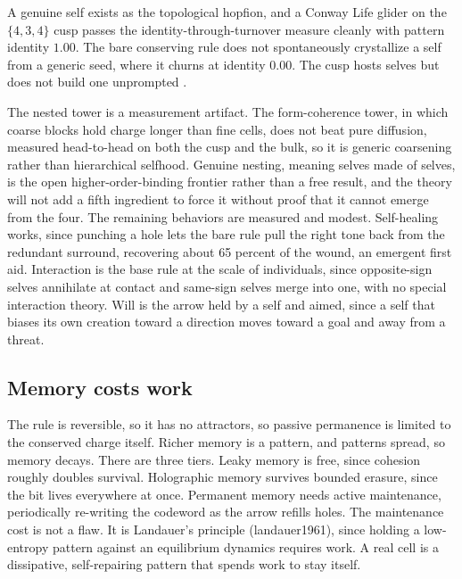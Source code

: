 \begin{result}
A genuine self exists as the topological hopfion, and a Conway Life glider on the $\{4,3,4\}$ cusp passes the identity-through-turnover measure cleanly with pattern identity $1.00$. The bare conserving rule does not spontaneously crystallize a self from a generic seed, where it churns at identity $0.00$. The cusp hosts selves but does not build one unprompted \cite{pollard2026vibetest}.
\end{result}

The nested tower is a measurement artifact. The form-coherence tower, in which coarse blocks hold charge longer than fine cells, does not beat pure diffusion, measured head-to-head on both the cusp and the bulk, so it is generic coarsening rather than hierarchical selfhood. Genuine nesting, meaning selves made of selves, is the open higher-order-binding frontier rather than a free result, and the theory will not add a fifth ingredient to force it without proof that it cannot emerge from the four. The remaining behaviors are measured and modest. Self-healing works, since punching a hole lets the bare rule pull the right tone back from the redundant surround, recovering about 65 percent of the wound, an emergent first aid. Interaction is the base rule at the scale of individuals, since opposite-sign selves annihilate at contact and same-sign selves merge into one, with no special interaction theory. Will is the arrow held by a self and aimed, since a self that biases its own creation toward a direction moves toward a goal and away from a threat.

\subsection{Memory costs work}

The rule is reversible, so it has no attractors, so passive permanence is limited to the conserved charge itself. Richer memory is a pattern, and patterns spread, so memory decays. There are three tiers. Leaky memory is free, since cohesion roughly doubles survival. Holographic memory survives bounded erasure, since the bit lives everywhere at once. Permanent memory needs active maintenance, periodically re-writing the codeword as the arrow refills holes. The maintenance cost is not a flaw. It is Landauer's principle (landauer1961), since holding a low-entropy pattern against an equilibrium dynamics requires work. A real cell is a dissipative, self-repairing pattern that spends work to stay itself.

